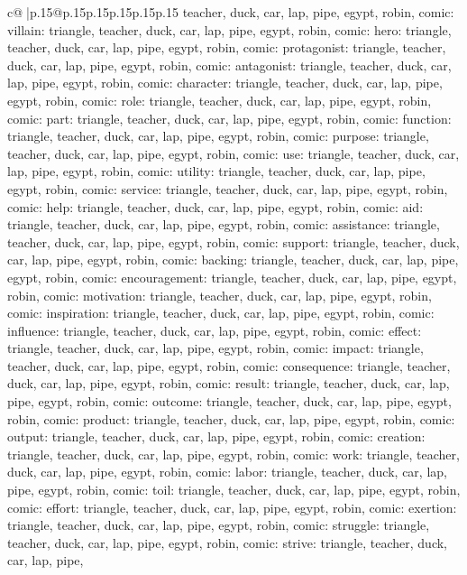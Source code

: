 \documentclass{article}
\begin{document}
{\begin{supertabular}{c@{$\;$}|p{.15\linewidth}@{}p{.15\linewidth}p{.15\linewidth}p{.15\linewidth}p{.15\linewidth}p{.15\linewidth}}
{{{teacher, duck, car, lap, pipe, egypt, robin, comic\n\nCLUE: villain\nTARGETS: triangle, teacher, duck, car, lap, pipe, egypt, robin, comic\n\nCLUE: hero\nTARGETS: triangle, teacher, duck, car, lap, pipe, egypt, robin, comic\n\nCLUE: protagonist\nTARGETS: triangle, teacher, duck, car, lap, pipe, egypt, robin, comic\n\nCLUE: antagonist\nTARGETS: triangle, teacher, duck, car, lap, pipe, egypt, robin, comic\n\nCLUE: character\nTARGETS: triangle, teacher, duck, car, lap, pipe, egypt, robin, comic\n\nCLUE: role\nTARGETS: triangle, teacher, duck, car, lap, pipe, egypt, robin, comic\n\nCLUE: part\nTARGETS: triangle, teacher, duck, car, lap, pipe, egypt, robin, comic\n\nCLUE: function\nTARGETS: triangle, teacher, duck, car, lap, pipe, egypt, robin, comic\n\nCLUE: purpose\nTARGETS: triangle, teacher, duck, car, lap, pipe, egypt, robin, comic\n\nCLUE: use\nTARGETS: triangle, teacher, duck, car, lap, pipe, egypt, robin, comic\n\nCLUE: utility\nTARGETS: triangle, teacher, duck, car, lap, pipe, egypt, robin, comic\n\nCLUE: service\nTARGETS: triangle, teacher, duck, car, lap, pipe, egypt, robin, comic\n\nCLUE: help\nTARGETS: triangle, teacher, duck, car, lap, pipe, egypt, robin, comic\n\nCLUE: aid\nTARGETS: triangle, teacher, duck, car, lap, pipe, egypt, robin, comic\n\nCLUE: assistance\nTARGETS: triangle, teacher, duck, car, lap, pipe, egypt, robin, comic\n\nCLUE: support\nTARGETS: triangle, teacher, duck, car, lap, pipe, egypt, robin, comic\n\nCLUE: backing\nTARGETS: triangle, teacher, duck, car, lap, pipe, egypt, robin, comic\n\nCLUE: encouragement\nTARGETS: triangle, teacher, duck, car, lap, pipe, egypt, robin, comic\n\nCLUE: motivation\nTARGETS: triangle, teacher, duck, car, lap, pipe, egypt, robin, comic\n\nCLUE: inspiration\nTARGETS: triangle, teacher, duck, car, lap, pipe, egypt, robin, comic\n\nCLUE: influence\nTARGETS: triangle, teacher, duck, car, lap, pipe, egypt, robin, comic\n\nCLUE: effect\nTARGETS: triangle, teacher, duck, car, lap, pipe, egypt, robin, comic\n\nCLUE: impact\nTARGETS: triangle, teacher, duck, car, lap, pipe, egypt, robin, comic\n\nCLUE: consequence\nTARGETS: triangle, teacher, duck, car, lap, pipe, egypt, robin, comic\n\nCLUE: result\nTARGETS: triangle, teacher, duck, car, lap, pipe, egypt, robin, comic\n\nCLUE: outcome\nTARGETS: triangle, teacher, duck, car, lap, pipe, egypt, robin, comic\n\nCLUE: product\nTARGETS: triangle, teacher, duck, car, lap, pipe, egypt, robin, comic\n\nCLUE: output\nTARGETS: triangle, teacher, duck, car, lap, pipe, egypt, robin, comic\n\nCLUE: creation\nTARGETS: triangle, teacher, duck, car, lap, pipe, egypt, robin, comic\n\nCLUE: work\nTARGETS: triangle, teacher, duck, car, lap, pipe, egypt, robin, comic\n\nCLUE: labor\nTARGETS: triangle, teacher, duck, car, lap, pipe, egypt, robin, comic\n\nCLUE: toil\nTARGETS: triangle, teacher, duck, car, lap, pipe, egypt, robin, comic\n\nCLUE: effort\nTARGETS: triangle, teacher, duck, car, lap, pipe, egypt, robin, comic\n\nCLUE: exertion\nTARGETS: triangle, teacher, duck, car, lap, pipe, egypt, robin, comic\n\nCLUE: struggle\nTARGETS: triangle, teacher, duck, car, lap, pipe, egypt, robin, comic\n\nCLUE: strive\nTARGETS: triangle, teacher, duck, car, lap, pipe, }}}
\end{supertabular}}
\end{document}
